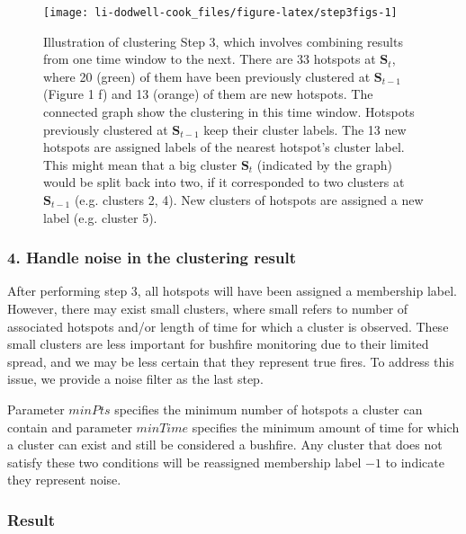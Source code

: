 \begin{figure}

{\centering \texttt{[image: li-dodwell-cook\_files/figure-latex/step3figs-1]} 

}

\caption{Illustration of clustering Step 3, which involves combining results from one time window to the next. There are 33 hotspots at $\boldsymbol{S}_t$, where 20 (green) of them have been previously clustered at $\boldsymbol{S}_{t-1}$ (Figure 1 f) and 13 (orange) of them are new hotspots. The connected graph show the clustering in this time window. Hotspots previously clustered at $\boldsymbol{S}_{t-1}$ keep their cluster labels. The 13 new hotspots are assigned labels of the nearest hotspot's cluster label. This might mean that a big cluster $\boldsymbol{S}_t$ (indicated by the graph) would be split back into two, if it corresponded to two clusters at $\boldsymbol{S}_{t-1}$ (e.g. clusters 2, 4). New clusters of hotspots are assigned a new label (e.g. cluster 5).}\label{fig:step3figs}
\end{figure}

\hypertarget{handle-noise-in-the-clustering-result}{%
\subsubsection{4. Handle noise in the clustering result}\label{handle-noise-in-the-clustering-result}}

After performing step 3, all hotspots will have been assigned a membership label. However, there may exist small clusters, where small refers to number of associated hotspots and/or length of time for which a cluster is observed. These small clusters are less important for bushfire monitoring due to their limited spread, and we may be less certain that they represent true fires. To address this issue, we provide a noise filter as the last step.

Parameter \(minPts\) specifies the minimum number of hotspots a cluster can contain and parameter \(minTime\) specifies the minimum amount of time for which a cluster can exist and still be considered a bushfire. Any cluster that does not satisfy these two conditions will be reassigned membership label \(-1\) to indicate they represent noise.

\hypertarget{result}{%
\subsubsection{Result}\label{result}}

